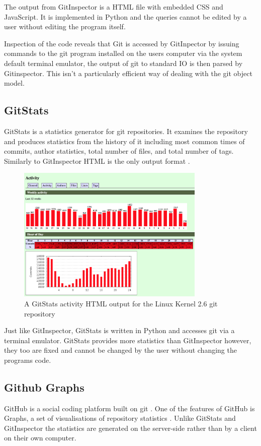 \documentclass[11pt]{book}
\begin{document}
The output from GitInspector is a HTML file with embedded CSS and JavaScript. It is implemented in Python and the queries cannot be edited by a user without editing the program itself.

Inspection of the code reveals that Git is accessed by GitInpector by issuing commands to the git program installed on the users computer via the system default terminal emulator, the output of git to standard IO is then parsed by Gitinspector. This isn't a particularly efficient way of dealing with the git object model. %


\subsection{GitStats}
GitStats is a statistics generator for git repositories. It examines the repository and produces statistics from the history of it including most common times of commits, author statistics, total number of files, and total number of tags. Similarly to GitInspector HTML is the only output format \cite{gitstatslinux}. 

\begin{figure}[h]
	\centering
	\includegraphics[width=0.8\textwidth]{images/gitstatslinux}
	\caption{A GitStats activity HTML output for the Linux Kernel 2.6 git repository \cite{gitstatslinux}}
	\label{fig:gitstatslinux}
\end{figure} 

Just like GitInspector, GitStats is written in Python and accesses git via a terminal emulator. GitStats provides more statistics than GitInspector however, they too are fixed and cannot be changed by the user without changing the programs code.

\subsection{Github Graphs}
GitHub is a social coding platform built on git \cite{gitpowersgithub}. One of the features of GitHub is Graphs, a set of visualisations of repository statistics \cite{githubgraphs}. Unlike GitStats and GitInspector the statistics are generated on the server-side rather than by a client on their own computer.
\end{document}
